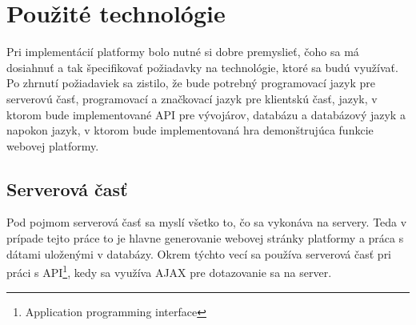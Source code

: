 
\chapter{Použité technológie}
\label{chap:technologie}
Pri implementácií platformy bolo nutné si dobre premyslieť, čoho sa má dosiahnuť a tak špecifikovať požiadavky na technológie, ktoré sa budú využívať. Po zhrnutí požiadaviek sa zistilo, že bude potrebný programovací jazyk pre serverovú časť, programovací a značkovací jazyk pre klientskú časť, jazyk, v ktorom bude implementované API pre vývojárov, databázu a databázový jazyk a napokon jazyk, v ktorom bude implementovaná hra demonštrujúca funkcie webovej platformy.

\section{Serverová časť}
\label{sec:server}
Pod pojmom serverová časť sa myslí všetko to, čo sa vykonáva na servery. Teda v prípade tejto práce to je hlavne generovanie webovej stránky platformy a práca s dátami uloženými v databázy. Okrem týchto vecí sa používa serverová časť pri práci s API\footnote{Application programming interface}, kedy sa využíva AJAX pre dotazovanie sa na server.

